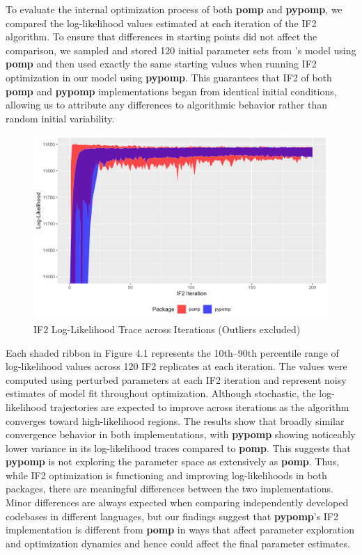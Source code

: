 \documentclass[11pt]{report}
\begin{document}
To evaluate the internal optimization process of both \textbf{pomp} and \textbf{pypomp}, we compared the log-likelihood values estimated at each iteration of the IF2 algorithm. To ensure that differences in starting points did not affect the comparison, we sampled and stored 120 initial parameter sets from \citet{sunmodel}'s model using \textbf{pomp} and then used exactly the same starting values when running IF2 optimization in our model using \textbf{pypomp}. This guarantees that IF2 of both \textbf{pomp} and \textbf{pypomp} implementations began from identical initial conditions, allowing us to attribute any differences to algorithmic behavior rather than random initial variability.
\begin{figure}[ht] 
\begin{center}
\includegraphics[width=\textwidth]{ll_trace_ribbon_plot.png}
\end{center}
\caption{IF2 Log-Likelihood Trace across Iterations (Outliers excluded)}
\label{fig:if2lltrace}
\end{figure}

Each shaded ribbon in Figure 4.1 represents the 10th–90th percentile range of log-likelihood values across 120 IF2 replicates at each iteration. The values were computed using perturbed parameters at each IF2 iteration and represent noisy estimates of model fit throughout optimization. Although stochastic, the log-likelihood trajectories are expected to improve across iterations as the algorithm converges toward high-likelihood regions.
The results show that broadly similar convergence behavior in both implementations, with \textbf{pypomp} showing noticeably lower variance in its log-likelihood traces compared to \textbf{pomp}. This suggests that \textbf{pypomp} is not exploring the parameter space as extensively as \textbf{pomp}. Thus, while IF2 optimization is functioning and improving log-likelihoods in both packages, there are meaningful differences between the two implementations. Minor differences are always expected when comparing independently developed codebases in different languages, but our findings suggest that \textbf{pypomp}’s IF2 implementation is different from \textbf{pomp} in ways that affect parameter exploration and optimization dynamics and hence could affect the final parameter estimates. 
\end{document}
